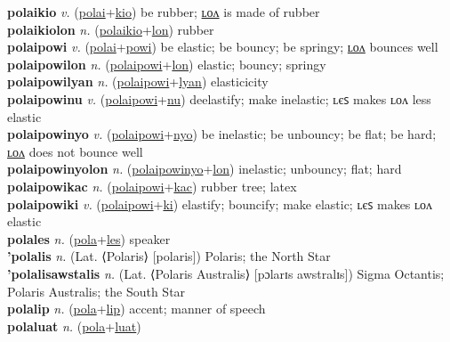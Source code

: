 \textbf{polaikio} \textit{v.} (\hyperref[polai]{polai}+\hyperref[kio]{kio})
be rubber; \hyperref[polaikiolon]{ʟᴏᴧ} is made of rubber \label{polaikio} \\
\textbf{polaikiolon} \textit{n.} (\hyperref[polaikio]{polaikio}+\hyperref[lon]{lon})
rubber \label{polaikiolon} \\
\textbf{polaipowi} \textit{v.} (\hyperref[polai]{polai}+\hyperref[powi]{powi})
be elastic; be bouncy; be springy; \hyperref[polaipowilon]{ʟᴏᴧ} bounces well \label{polaipowi} \\
\textbf{polaipowilon} \textit{n.} (\hyperref[polaipowi]{polaipowi}+\hyperref[lon]{lon})
elastic; bouncy; springy \label{polaipowilon} \\
\textbf{polaipowilyan} \textit{n.} (\hyperref[polaipowi]{polaipowi}+\hyperref[lyan]{lyan})
elasticicity \label{polaipowilyan} \\
\textbf{polaipowinu} \textit{v.} (\hyperref[polaipowi]{polaipowi}+\hyperref[nu]{nu})
deelastify; make inelastic; ʟєꜱ makes ʟᴏᴧ less elastic \label{polaipowinu} \\
\textbf{polaipowinyo} \textit{v.} (\hyperref[polaipowi]{polaipowi}+\hyperref[nyo]{nyo})
be inelastic; be unbouncy; be flat; be hard; \hyperref[polaipowinyolon]{ʟᴏᴧ} does not bounce well \label{polaipowinyo} \\
\textbf{polaipowinyolon} \textit{n.} (\hyperref[polaipowinyo]{polaipowinyo}+\hyperref[lon]{lon})
inelastic; unbouncy; flat; hard \label{polaipowinyolon} \\
\textbf{polaipowikac} \textit{n.} (\hyperref[polaipowi]{polaipowi}+\hyperref[kac]{kac})
rubber tree; latex \label{polaipowikac} \\
\textbf{polaipowiki} \textit{v.} (\hyperref[polaipowi]{polaipowi}+\hyperref[ki]{ki})
elastify; bouncify; make elastic; ʟєꜱ makes ʟᴏᴧ elastic \label{polaipowiki} \\
\textbf{polales} \textit{n.} (\hyperref[pola]{pola}+\hyperref[les]{les})
speaker \label{polales} \\
\textbf{'polalis} \textit{n.} (Lat. ⟨Polaris⟩ [polaris])
Polaris; the North Star \label{'polalis} \\
\textbf{'polalisawstalis} \textit{n.} (Lat. ⟨Polaris Australis⟩ [pɔlarɪs awstralɪs])
Sigma Octantis; Polaris Australis; the South Star \label{'polalisawstalis} \\
\textbf{polalip} \textit{n.} (\hyperref[pola]{pola}+\hyperref[lip]{lip})
accent; manner of speech \label{polalip} \\
\textbf{polaluat} \textit{n.} (\hyperref[pola]{pola}+\hyperref[luat]{luat})
